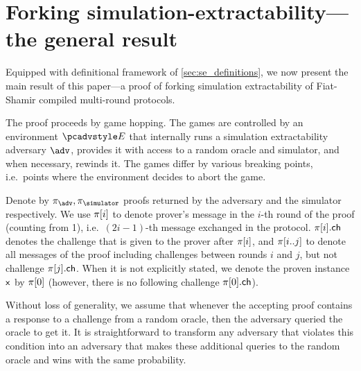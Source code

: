 \section{Forking simulation-extractability---the general result}
\label{sec:general}
Equipped with definitional framework of \cref{sec:se_definitions}, we now present the main result of this paper---a proof of
forking simulation extractability of Fiat-Shamir compiled multi-round protocols.

The proof proceeds by game hopping. The games are controlled by an environment $\env$
that internally runs a simulation extractability adversary $\advse$, provides it
with access to a random oracle and simulator, and when necessary, rewinds it. The
games differ by various breaking points, i.e.~points where the environment
decides to abort the game.

Denote by $\zkproof_{\advse}, \zkproof_{\simulator}$ proofs returned by the
adversary and the simulator respectively. We use $\pi[i]$ to denote
prover's message in the $i$-th round of the proof (counting from 1),
i.e.~$(2i - 1)$-th message exchanged in the protocol. $\pi[i].\mathsf{ch}$ denotes
the challenge that is given to the prover after $\pi[i]$, and
$\pi[i..j]$ to denote all messages of the proof including challenges
between rounds $i$ and $j$, but not challenge $\pi[j].\mathsf{ch}$. When it is not
explicitly stated, we denote the proven instance $\mathsf{x}$ by $\pi[0]$
(however, there is no following challenge $\pi[0].\mathsf{ch}$).

Without loss of generality, we assume that whenever the accepting proof contains
a response to a challenge from a random oracle, then the adversary queried the
oracle to get it. It is straightforward to transform any adversary that violates
this condition into an adversary that makes these additional queries to the
random oracle and wins with the same probability.


